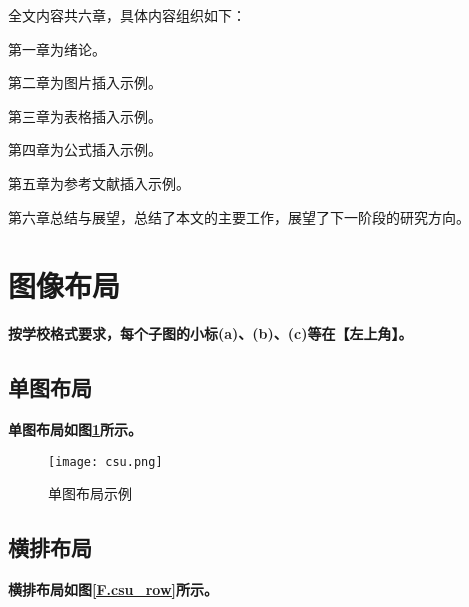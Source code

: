 全文内容共六章，具体内容组织如下：

第一章为绪论。

第二章为图片插入示例。

第三章为表格插入示例。

第四章为公式插入示例。

第五章为参考文献插入示例。

第六章总结与展望，总结了本文的主要工作，展望了下一阶段的研究方向。

\newpage

\section{图像布局}
\label{sec.figure}
\textbf{按学校格式要求，每个子图的小标(a)、(b)、(c)等在【左上角】。}

\subsection{单图布局}

\lipsum

\textbf{单图布局如图\ref{F.csu_single}所示。}

\begin{figure}[hbt]
\centering
\texttt{[image: csu.png]}
\caption{单图布局示例}
\label{F.csu_single}
\end{figure}

\subsection{横排布局}

\textbf{横排布局如图\ref{F.csu_row}所示。}

